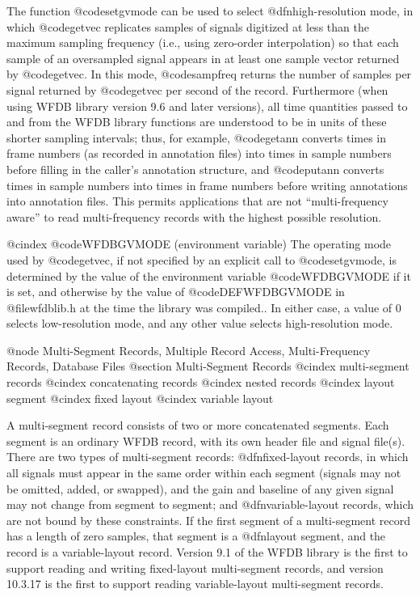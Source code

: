{{{{{{{{{The function @code{setgvmode} can be used to select @dfn{high-resolution} mode,
in which @code{getvec} replicates samples of signals digitized at less than the
maximum sampling frequency (i.e., using zero-order interpolation) so that each
sample of an oversampled signal appears in at least one sample vector returned
by @code{getvec}.  In this mode, @code{sampfreq} returns the number of samples
per signal returned by @code{getvec} per second of the record.  Furthermore
(when using WFDB library version 9.6 and later versions), all time quantities
passed to and from the WFDB library functions are understood to be in units of
these shorter sampling intervals; thus, for example, @code{getann} converts
times in frame numbers (as recorded in annotation files) into times in sample
numbers before filling in the caller's annotation structure, and @code{putann}
converts times in sample numbers into times in frame numbers before writing
annotations into annotation files.  This permits applications that are not
``multi-frequency aware'' to read multi-frequency records with the highest
possible resolution.

@cindex @code{WFDBGVMODE} (environment variable)
The operating mode used by @code{getvec}, if not specified by an explicit call
to @code{setgvmode}, is determined by the value of the environment variable
@code{WFDBGVMODE} if it is set, and otherwise by the value of
@code{DEFWFDBGVMODE} in @file{wfdblib.h} at the time the library was compiled..
In either case, a value of 0 selects low-resolution mode, and any other value
selects high-resolution mode.

@node     Multi-Segment Records, Multiple Record Access, Multi-Frequency Records, Database Files
@section Multi-Segment Records
@cindex multi-segment records
@cindex concatenating records
@cindex nested records
@cindex layout segment
@cindex fixed layout
@cindex variable layout

A multi-segment record consists of two or more concatenated segments.
Each segment is an ordinary WFDB record, with its own header file and
signal file(s).  There are two types of multi-segment records:
@dfn{fixed-layout} records, in which all signals must appear in the
same order within each segment (signals may not be omitted, added, or
swapped), and the gain and baseline of any given signal may not change
from segment to segment; and @dfn{variable-layout} records, which are
not bound by these constraints.  If the first segment of a
multi-segment record has a length of zero samples, that segment is a
@dfn{layout segment}, and the record is a variable-layout record.
Version 9.1 of the WFDB library is the first to support reading and
writing fixed-layout multi-segment records, and version 10.3.17 is the
first to support reading variable-layout multi-segment records.

}}}}}}}}}
